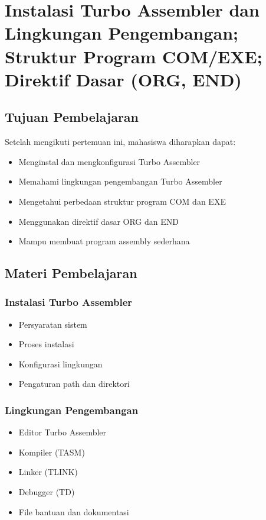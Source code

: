 \chapter{Instalasi Turbo Assembler dan Lingkungan Pengembangan; Struktur Program COM/EXE; Direktif Dasar (ORG, END)}

\section{Tujuan Pembelajaran}
Setelah mengikuti pertemuan ini, mahasiswa diharapkan dapat:
\begin{itemize}
\item Menginstal dan mengkonfigurasi Turbo Assembler
\item Memahami lingkungan pengembangan Turbo Assembler
\item Mengetahui perbedaan struktur program COM dan EXE
\item Menggunakan direktif dasar ORG dan END
\item Mampu membuat program assembly sederhana
\end{itemize}

\section{Materi Pembelajaran}

\subsection{Instalasi Turbo Assembler}
\begin{itemize}
\item Persyaratan sistem
\item Proses instalasi
\item Konfigurasi lingkungan
\item Pengaturan path dan direktori
\end{itemize}

\subsection{Lingkungan Pengembangan}
\begin{itemize}
\item Editor Turbo Assembler
\item Kompiler (TASM)
\item Linker (TLINK)
\item Debugger (TD)
\item File bantuan dan dokumentasi
\end{itemize}

